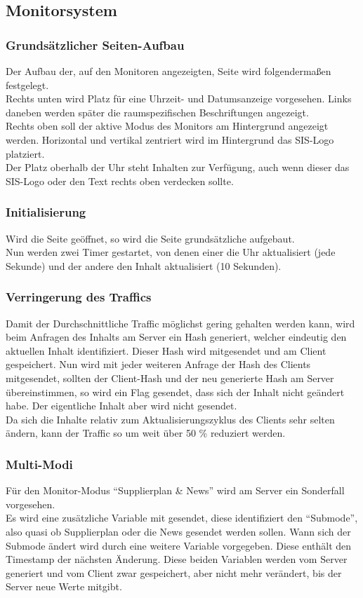 \subsection{Monitorsystem}

\subsubsection{Grundsätzlicher Seiten-Aufbau}

Der Aufbau der, auf den Monitoren angezeigten, Seite wird folgendermaßen festgelegt.\\
Rechts unten wird Platz für eine Uhrzeit- und Datumsanzeige vorgesehen. Links daneben werden später die raumspezifischen Beschriftungen angezeigt.\\
Rechts oben soll der aktive Modus des Monitors am Hintergrund angezeigt werden. Horizontal und vertikal zentriert wird im Hintergrund das SIS-Logo platziert.\\
Der Platz oberhalb der Uhr steht Inhalten zur Verfügung, auch wenn dieser das SIS-Logo oder den Text rechts oben verdecken sollte.

\subsubsection{Initialisierung}

Wird die Seite geöffnet, so wird die Seite grundsätzliche aufgebaut.\\
Nun werden zwei Timer gestartet, von denen einer die Uhr aktualisiert (jede Sekunde) und der andere den Inhalt aktualisiert (10 Sekunden).

\subsubsection{Verringerung des Traffics}
Damit der Durchschnittliche Traffic möglichst gering gehalten werden kann, wird beim Anfragen des Inhalts am Server ein Hash generiert, welcher eindeutig den aktuellen Inhalt identifiziert. Dieser Hash wird mitgesendet und am Client gespeichert. Nun wird mit jeder weiteren Anfrage der Hash des Clients mitgesendet, sollten der Client-Hash und der neu generierte Hash am Server übereinstimmen, so wird ein Flag gesendet, dass sich der Inhalt nicht geändert habe. Der eigentliche Inhalt aber wird nicht gesendet.\\
Da sich die Inhalte relativ zum Aktualisierungszyklus des Clients sehr selten ändern, kann der Traffic so um weit über 50 \% reduziert werden.

\subsubsection{Multi-Modi}
Für den Monitor-Modus \enquote{Supplierplan \& News} wird am Server ein Sonderfall vorgesehen.\\
Es wird eine zusätzliche Variable mit gesendet, diese identifiziert den \enquote{Submode}, also quasi ob Supplierplan oder die News gesendet werden sollen. Wann sich der Submode ändert wird durch eine weitere Variable vorgegeben. Diese enthält den Timestamp der nächsten Änderung. Diese beiden Variablen werden vom Server generiert und vom Client zwar gespeichert, aber nicht mehr verändert, bis der Server neue Werte mitgibt.